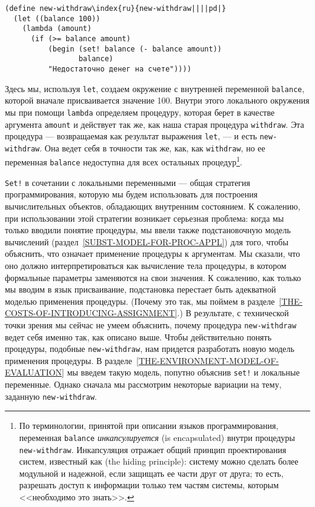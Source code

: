 \begin{Verbatim}[fontsize=\small]
(define new-withdraw\index{ru}{new-withdraw||||pd|}
  (let ((balance 100))
    (lambda (amount)
      (if (>= balance amount)
          (begin (set! balance (- balance amount))
                 balance)
          "Недостаточно денег на счете"))))
\end{Verbatim}
Здесь мы, используя {\tt let}, создаем окружение с внутренней
переменной {\tt ba\-lance}, которой вначале присваивается
значение 100.  Внутри этого локального окружения мы при помощи
{\tt lambda} определяем процедуру, которая берет в
качестве аргумента {\tt amount} и действует так же, как наша
старая процедура {\tt withdraw}.  Эта процедура ---
возвращаемая как результат выражения
{\tt let}, --- и есть {\tt new-withdraw}. Она ведет
себя в точности так же, как, как {\tt withdraw}, но ее
переменная {\tt balance} недоступна для всех остальных
процедур\footnote{По терминологии, принятой при описании языков программирования,
переменная {\tt balance}
%
%
%
%
%
{\em инкапсулируется} (is encapsulated) внутри процедуры
{\tt new-withdraw}.  Инкапсуляция отражает общий принцип
проектирования систем, известный как
%
%
 (the hiding principle): систему можно
сделать более модульной и надежной, если защищать ее части друг
от друга; то есть, разрешать доступ к информации только тем частям
системы, которым <<необходимо это знать>>.}.

{\tt Set!} в сочетании с локальными
переменными --- общая стратегия программирования, которую мы будем
использовать для построения вычислительных объектов, обладающих
внутренним состоянием.  К сожалению, при использовании этой стратегии
возникает серьезная проблема: когда мы только вводили понятие процедуры, мы
ввели также подстановочную модель вычислений
(раздел~\ref{SUBST-MODEL-FOR-PROC-APPL}) для того, чтобы
объяснить, что означает применение процедуры к аргументам.  Мы
сказали, что оно должно интерпретироваться как вычисление тела
процедуры, в котором формальные параметры заменяются на свои
значения.  К сожалению, как только мы вводим в язык присваивание,
подстановка перестает быть адекватной моделью применения
процедуры. (Почему это так, мы поймем в
разделе~\ref{THE-COSTS-OF-INTRODUCING-ASSIGNMENT}.)  В
результате,
с технической точки зрения мы сейчас не умеем объяснить, почему
процедура {\tt new-withdraw} ведет себя именно так, как описано
выше.  Чтобы действительно понять процедуры, подобные
{\tt new-withdraw}, нам придется разработать новую модель
применения процедуры.  В
разделе~\ref{THE-ENVIRONMENT-MODEL-OF-EVALUATION} мы введем такую
модель, попутно объяснив {\tt set!} и локальные
переменные.  Однако сначала мы рассмотрим некоторые вариации на тему,
заданную {\tt new-withdraw}.

